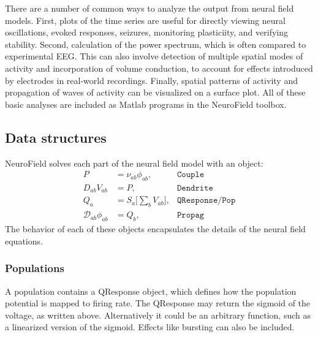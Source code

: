 \documentclass[preprint,review,10pt,authoryear,letterpaper]{elsarticle}
\begin{document}
There are a number of common ways to analyze the output from neural field models. First, plots of the time series are useful for directly viewing neural oscillations, evoked responses, seizures, monitoring plasticiity, and verifying stability. Second, calculation of the power spectrum, which is often compared to experimental EEG. This can also involve detection of multiple spatial modes of activity and incorporation of volume conduction, to account for effects introduced by electrodes in real-world recordings. Finally, spatial patterns of activity and propagation of waves of activity can be visualized on a surface plot. All of these basic analyses are included as Matlab programs in the NeuroField toolbox. 



\subsection{Data structures}

NeuroField solves each part of the neural field model with an object:
\begin{align*}
	P &= \nu_{ab}\phi_{ab}, & \mathtt{Couple}\\
	D_{ab}V_{ab} &= P, & \mathtt{Dendrite}\\
	Q_a &= S_a \big[\sum_b V_{ab} \big], & \mathtt{QResponse/Pop}\\
	\mathcal{D}_{ab}\phi_{ab} &= Q_b,&  \mathtt{Propag}
\end{align*}
The behavior of each of these objects encapsulates the details of the neural field equations.

\subsubsection{Populations}
A population contains a QResponse object, which defines how the population potential is mapped to firing rate. The QResponse may return the sigmoid of the voltage, as written above. Alternatively it could be an arbitrary function, such as a linearized version of the sigmoid. Effects like bursting can also be included.
\end{document}
